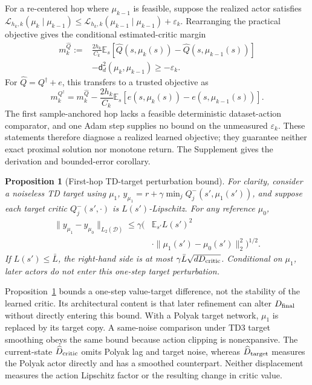 \documentclass[twoside]{article}
\newtheorem{proposition}{Proposition}
\begin{document}
For a re-centered hop where $\mu_{k-1}$ is feasible, suppose the realized
actor satisfies
$\mathcal L_{h_k,k}(\mu_k\mid\mu_{k-1})\le
\mathcal L_{h_k,k}(\mu_{k-1}\mid\mu_{k-1})+\varepsilon_k$.
Rearranging the practical objective gives the conditional estimated-critic
margin
\begin{equation}
\begin{split}
 m_k^{\widehat Q}:={}&\frac{2h_k}{C_k}\mathbb E_s
 [\widehat Q(s,\mu_k(s))-\widehat Q(s,\mu_{k-1}(s))]\\
 &-\mathsf d_d^2(\mu_k,\mu_{k-1})\ge-\varepsilon_k.
\end{split}
\label{eq:margin}
\end{equation}
For $\widehat Q=Q^\dagger+e$, this transfers to a trusted objective as
\begin{equation}
 m_k^{Q^\dagger}=m_k^{\widehat Q}
 -\frac{2h_k}{C_k}\mathbb E_s[e(s,\mu_k(s))-e(s,\mu_{k-1}(s))].
\label{eq:critic_error_margin}
\end{equation}
The first sample-anchored hop lacks a feasible deterministic dataset-action
comparator, and one Adam step supplies no bound on the unmeasured
$\varepsilon_k$. These statements therefore diagnose a realized learned
objective; they guarantee neither exact proximal solution nor monotone return.
The Supplement gives the derivation and bounded-error corollary.

\begin{proposition}[First-hop TD-target perturbation bound]
\label{prop:exposure}
For clarity, consider a noiseless TD target using $\mu_1$,
$y_{\mu_1}=r+\gamma\min_jQ_j^-(s',\mu_1(s'))$, and suppose each target critic
$Q_j^-(s',\cdot)$ is $L(s')$-Lipschitz. For any reference $\mu_0$,
\begin{equation}
\begin{split}
\|y_{\mu_1}-y_{\mu_0}\|_{L_2(\mathcal D)}
\leq\gamma\Big(&\mathbb E_{s'}L(s')^2\\
&\cdot\|\mu_1(s')-\mu_0(s')\|_2^2\Big)^{1/2}.
\end{split}
\label{eq:exposure_bound}
\end{equation}
If $L(s')\leq\bar L$, the right-hand side is at most
$\gamma\bar L\sqrt{dD_{\rm critic}}$. Conditional on $\mu_1$, later actors do
not enter this one-step target perturbation.
\end{proposition}

Proposition~\ref{prop:exposure} bounds a one-step value-target difference, not
the stability of the learned critic. Its architectural content is that later
refinement can alter $D_{\rm final}$ without directly entering this bound.
With a Polyak target network, $\mu_1$ is replaced by its target copy. A
same-noise comparison under TD3 target smoothing obeys the same bound because
action clipping is nonexpansive. The current-state
$\widehat D_{\rm critic}$ omits Polyak lag and target noise, whereas
$\widehat D_{\rm target}$ measures the Polyak actor directly and has a
smoothed counterpart. Neither displacement measures the action Lipschitz
factor or the resulting change in critic value.
\end{document}
